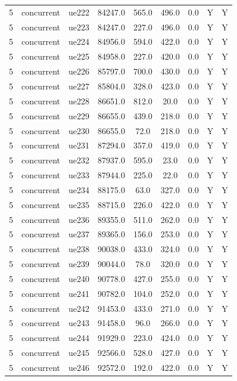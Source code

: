 \begin{table}[ht]
\begin{tabular}{|c|c|c|c|c|c|c|c|c|}
5 & concurrent & ue222 & 84247.0 & 565.0 & 496.0 & 0.0 & Y & Y \\
5 & concurrent & ue223 & 84247.0 & 227.0 & 496.0 & 0.0 & Y & Y \\
5 & concurrent & ue224 & 84956.0 & 594.0 & 422.0 & 0.0 & Y & Y \\
5 & concurrent & ue225 & 84958.0 & 227.0 & 420.0 & 0.0 & Y & Y \\
5 & concurrent & ue226 & 85797.0 & 700.0 & 430.0 & 0.0 & Y & Y \\
5 & concurrent & ue227 & 85804.0 & 328.0 & 423.0 & 0.0 & Y & Y \\
5 & concurrent & ue228 & 86651.0 & 812.0 & 20.0 & 0.0 & Y & Y \\
5 & concurrent & ue229 & 86655.0 & 439.0 & 218.0 & 0.0 & Y & Y \\
5 & concurrent & ue230 & 86655.0 & 72.0 & 218.0 & 0.0 & Y & Y \\
5 & concurrent & ue231 & 87294.0 & 357.0 & 419.0 & 0.0 & Y & Y \\
5 & concurrent & ue232 & 87937.0 & 595.0 & 23.0 & 0.0 & Y & Y \\
5 & concurrent & ue233 & 87944.0 & 225.0 & 22.0 & 0.0 & Y & Y \\
5 & concurrent & ue234 & 88175.0 & 63.0 & 327.0 & 0.0 & Y & Y \\
5 & concurrent & ue235 & 88715.0 & 226.0 & 422.0 & 0.0 & Y & Y \\
5 & concurrent & ue236 & 89355.0 & 511.0 & 262.0 & 0.0 & Y & Y \\
5 & concurrent & ue237 & 89365.0 & 156.0 & 253.0 & 0.0 & Y & Y \\
5 & concurrent & ue238 & 90038.0 & 433.0 & 324.0 & 0.0 & Y & Y \\
5 & concurrent & ue239 & 90044.0 & 78.0 & 320.0 & 0.0 & Y & Y \\
5 & concurrent & ue240 & 90778.0 & 427.0 & 255.0 & 0.0 & Y & Y \\
5 & concurrent & ue241 & 90782.0 & 104.0 & 252.0 & 0.0 & Y & Y \\
5 & concurrent & ue242 & 91453.0 & 433.0 & 271.0 & 0.0 & Y & Y \\
5 & concurrent & ue243 & 91458.0 & 96.0 & 266.0 & 0.0 & Y & Y \\
5 & concurrent & ue244 & 91929.0 & 223.0 & 424.0 & 0.0 & Y & Y \\
5 & concurrent & ue245 & 92566.0 & 528.0 & 427.0 & 0.0 & Y & Y \\
5 & concurrent & ue246 & 92572.0 & 192.0 & 422.0 & 0.0 & Y & Y \\

\end{tabular}
\end{table}
